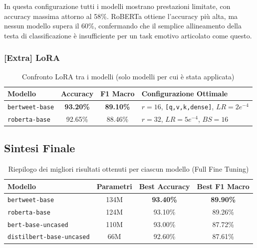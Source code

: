 \documentclass[a4paper,12pt]{article}
\begin{document}
In questa configurazione tutti i modelli mostrano prestazioni limitate, con accuracy massima attorno al 58\%.
RoBERTa ottiene l'accuracy più alta, ma nessun modello supera il 60\%, confermando che il semplice allineamento
della testa di classificazione è insufficiente per un task emotivo articolato come questo.

\subsubsection{[Extra] LoRA }

\begin{table}[H]
    \centering
    \renewcommand{\arraystretch}{1.3}
    \begin{tabular}{|l|c|c|l|}
        \hline
        \textbf{Modello}       & \textbf{Accuracy} & \textbf{F1 Macro} & \textbf{Configurazione Ottimale}             \\
        \hline
        \texttt{bertweet-base} & \textbf{93.20\%}  & \textbf{89.10\%}  & $r=16$, \texttt{[q,v,k,dense]}, $LR=2e^{-4}$ \\
        \texttt{roberta-base}  & 92.65\%           & 88.46\%           & $r=32$, $LR=5e^{-4}$, $BS=16$                \\
        \hline
    \end{tabular}
    \caption{Confronto LoRA tra i modelli (solo modelli per cui è stata applicata)}
\end{table}

\subsection{Sintesi Finale}

\begin{table}[H]
    \centering
    \renewcommand{\arraystretch}{1.3}
    \begin{tabular}{|l|c|c|c|}
        \hline
        \textbf{Modello}                 & \textbf{Parametri} & \textbf{Best Accuracy} & \textbf{Best F1 Macro} \\
        \hline
        \texttt{bertweet-base}           & 134M               & \textbf{93.40\%}       & \textbf{89.90\%}       \\
        \texttt{roberta-base}            & 124M               & 93.10\%                & 89.26\%                \\
        \texttt{bert-base-uncased}       & 110M               & 93.00\%                & 87.72\%                \\
        \texttt{distilbert-base-uncased} & 66M                & 92.60\%                & 87.61\%                \\
        \hline
    \end{tabular}
    \caption{Riepilogo dei migliori risultati ottenuti per ciascun modello (Full Fine Tuning)}
    \label{tab:model_comparison}
\end{table}
\end{document}

